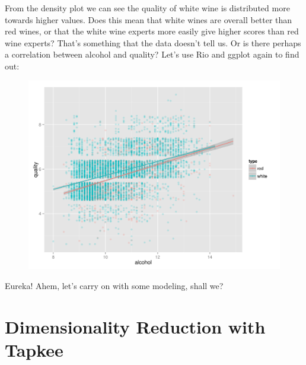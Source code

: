 \documentclass[
]{book}
\newenvironment{Shaded}{\begin{snugshade}}{\end{snugshade}}
\newcommand{\ExtensionTok}[1]{#1}
\newcommand{\KeywordTok}[1]{\textcolor[rgb]{0.13,0.29,0.53}{\textbf{#1}}}
\newcommand{\NormalTok}[1]{#1}
\newcommand{\OperatorTok}[1]{\textcolor[rgb]{0.81,0.36,0.00}{\textbf{#1}}}
\newcommand{\StringTok}[1]{\textcolor[rgb]{0.31,0.60,0.02}{#1}}
\theoremstyle{definition}
\theoremstyle{definition}
\theoremstyle{definition}
\theoremstyle{remark}
\begin{document}
From the density plot we can see the quality of white wine is distributed more towards higher values. Does this mean that white wines are overall better than red wines, or that the white wine experts more easily give higher scores than red wine experts? That's something that the data doesn't tell us. Or is there perhaps a correlation between alcohol and quality? Let's use Rio and ggplot again to find out:

\begin{Shaded}
\end{Shaded}

\begin{figure}

{\centering \includegraphics[width=32.81in]{images/ch09-wine-alcohol-vs-quality} 

}

\end{figure}

Eureka! Ahem, let's carry on with some modeling, shall we?

\hypertarget{dimensionality-reduction-with-tapkee}{%
\section{Dimensionality Reduction with Tapkee}\label{dimensionality-reduction-with-tapkee}}
\end{document}
